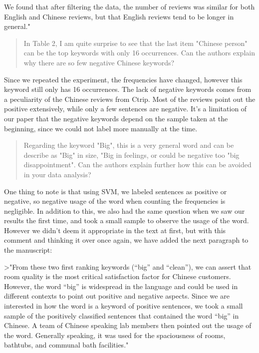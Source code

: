 \documentclass{letter}
\begin{document}
We found that after filtering the data, the number of reviews was similar for both English and Chinese reviews, but that English reviews tend to be longer in general."



\begin{quotation}
In Table 2, I am quite surprise to see that the last item "Chinese person" can be the top keywords with only 16 occurrences. Can the authors explain why there are so few negative Chinese keywords?
\end{quotation}

Since we repeated the experiment, the frequencies have changed, however this keyword still only has 16 occurrences. The lack of negative keywords comes from a peculiarity of the Chinese reviews from Ctrip. Most of the reviews point out the positive extensively, while only a few sentences are negative. It's a limitation of our paper that the negative keywords depend on the sample taken at the beginning, since we could not label more manually at the time.



\begin{quotation}
Regarding the keyword "Big", this is a very general word and can be describe as "Big" in size, "Big in feelings, or could be negative too "big disappointment". Can the authors explain further how this can be avoided in your data analysis?
\end{quotation}

One thing to note is that using SVM, we labeled sentences as positive or negative, so negative usage of the word when counting the frequencies is negligible. In addition to this, we also had the same question when we saw our results the first time, and took a small sample to observe the usage of the word. However we didn't deem it appropriate in the text at first, but with this comment and thinking it over once again, we have added the next paragraph to the manuscript:

>"From these two first ranking keywords (“big” and “clean”), we can assert
that room quality is the most critical satisfaction factor for Chinese customers. However, the word “big” is widespread in the language and could be used in different contexts to point out positive and negative aspects. Since we are interested in how the word is a keyword of positive sentences, we took a small sample of the positively classified sentences that contained the word “big” in Chinese. A team of Chinese speaking lab members then pointed out the usage of the word. Generally speaking, it was used for the spaciousness of rooms, bathtubs, and communal bath facilities." 
\end{document}
